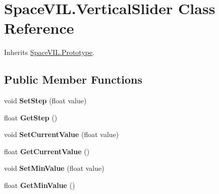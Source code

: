 \hypertarget{class_space_v_i_l_1_1_vertical_slider}{}\section{Space\+V\+I\+L.\+Vertical\+Slider Class Reference}
\label{class_space_v_i_l_1_1_vertical_slider}


Inherits \mbox{\hyperlink{class_space_v_i_l_1_1_prototype}{Space\+V\+I\+L.\+Prototype}}.

\subsection*{Public Member Functions}
\begin{DoxyCompactItemize}
\item 
\mbox{\label{class_space_v_i_l_1_1_vertical_slider_a12eb440bb08e00f9e0c611ca4377f2df}} 
void {\bfseries Set\+Step} (float value)
\item 
\mbox{\label{class_space_v_i_l_1_1_vertical_slider_a261cc4ef533e8000f2b78f98e84cf69a}} 
float {\bfseries Get\+Step} ()
\item 
\mbox{\label{class_space_v_i_l_1_1_vertical_slider_a2210116ef1046c4abdb047271a02849c}} 
void {\bfseries Set\+Current\+Value} (float value)
\item 
\mbox{\label{class_space_v_i_l_1_1_vertical_slider_a1f4e2ee3101ecfcb0621a657d000feb1}} 
float {\bfseries Get\+Current\+Value} ()
\item 
\mbox{\label{class_space_v_i_l_1_1_vertical_slider_a251e736539ac13eca1febefaef0b44ea}} 
void {\bfseries Set\+Min\+Value} (float value)
\item 
\mbox{\label{class_space_v_i_l_1_1_vertical_slider_ad7f898117dbae50c5ebe00418c80c689}} 
float {\bfseries Get\+Min\+Value} ()
\item 
\mbox{\label{class_space_v_i_l_1_1_vertical_slider_adb5ef8f273daa3cfd4607b644c44866d}} 

\end{DoxyCompactItemize}
